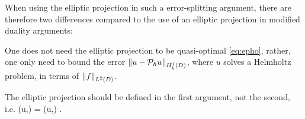 
When using the elliptic projection in such a error-splitting argument, there are therefore two differences compared to the use of an elliptic projection in modified duality arguments:
\ben
\item One does not need the elliptic projection to be quasi-optimal \cref{eq:epho}, rather, one only need to bound the error $\NHokD{u-\Ph u}$, where $u$ solves a Helmholtz problem, in terms of $\NLtD{f}$.
\item The elliptic projection should be defined in the first argument, not the second, i.e.
  \beq\label{eq:ellprojfirst}
\aT(\Ph u,\vh) = \aT(u,\vh) \tforall \vh \in \Vhp.
  \eeq
\een







